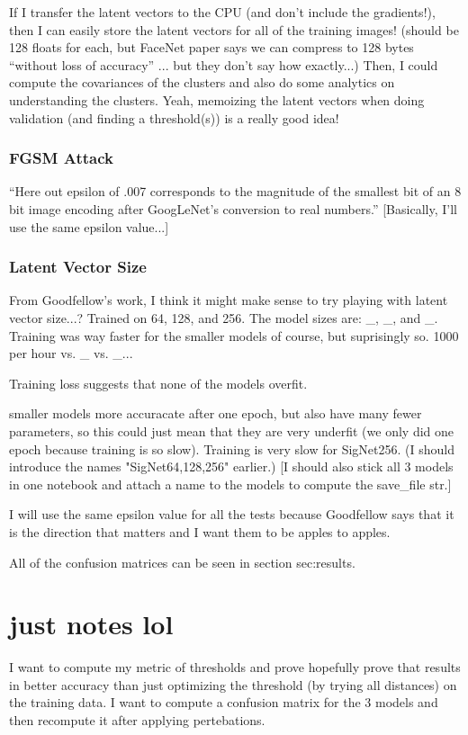 If I transfer the latent vectors to the CPU (and don't include the gradients!), then I can easily store the latent vectors for all of the training images!
(should be 128 floats for each, but FaceNet paper says we can compress to 128 bytes ``without loss of accuracy'' ... but they don't say how exactly...)
Then, I could compute the covariances of the clusters and also do some analytics on understanding the clusters.
Yeah, memoizing the latent vectors when doing validation (and finding a threshold(s)) is a really good idea!

\subsubsection{FGSM Attack}
``Here out epsilon of .007 corresponds to the magnitude of the
smallest bit of an 8 bit image encoding after GoogLeNet's conversion to real numbers.''\cite{goodfellow}
[Basically, I'll use the same epsilon value...]

\subsubsection{Latent Vector Size}
From Goodfellow's work, I think it might make sense to try playing with latent vector size...?
Trained on 64, 128, and 256.
The model sizes are: \_, \_, and \_.
Training was way faster for the smaller models of course, but suprisingly so.
1000 per hour vs. \_ vs. \_...

Training loss suggests that none of the models overfit.

smaller models more accuracate after one epoch, but also have many fewer parameters, so this could just mean that they are very underfit (we only did one epoch because training is so slow).
Training is very slow for SigNet256.
(I should introduce the names "SigNet64,128,256" earlier.)
[I should also stick all 3 models in one notebook and attach a name to the models to compute the save\_file str.]

I will use the same epsilon value for all the tests because Goodfellow says that it is the direction that matters and I want them to be apples to apples.

All of the confusion matrices can be seen in section {sec:results}.



\section{just notes lol}
I want to compute my metric of thresholds and prove hopefully prove that results in better accuracy than just optimizing the threshold (by trying all distances) on the training data.
I want to compute a confusion matrix for the 3 models and then recompute it after applying pertebations.

